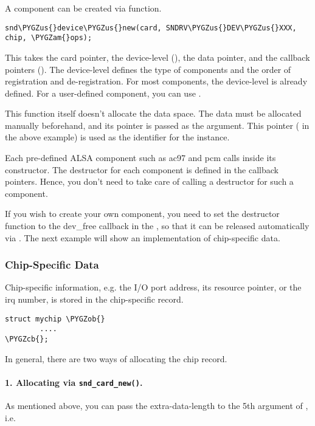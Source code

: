 \documentclass[a4paper,8pt,english]{sphinxmanual}
\def\PYGZus{\char`\_}
\def\PYGZob{\char`\{}
\def\PYGZcb{\char`\}}
\def\PYGZam{\char`\&}
\begin{document}
A component can be created via 
function.

\begin{Verbatim}[commandchars=\\\{\}]
snd\PYGZus{}device\PYGZus{}new(card, SNDRV\PYGZus{}DEV\PYGZus{}XXX, chip, \PYGZam{}ops);
\end{Verbatim}

This takes the card pointer, the device-level (), the
data pointer, and the callback pointers (). The device-level
defines the type of components and the order of registration and
de-registration. For most components, the device-level is already
defined. For a user-defined component, you can use
.

This function itself doesn't allocate the data space. The data must be
allocated manually beforehand, and its pointer is passed as the
argument. This pointer ( in the above example) is used as the
identifier for the instance.

Each pre-defined ALSA component such as ac97 and pcm calls
 inside its constructor. The destructor
for each component is defined in the callback pointers. Hence, you don't
need to take care of calling a destructor for such a component.

If you wish to create your own component, you need to set the destructor
function to the dev\_free callback in the , so that it can be
released automatically via . The next
example will show an implementation of chip-specific data.


\subsubsection{Chip-Specific Data}
\label{sound/kernel-api/writing-an-alsa-driver:chip-specific-data}
Chip-specific information, e.g. the I/O port address, its resource
pointer, or the irq number, is stored in the chip-specific record.

\begin{Verbatim}[commandchars=\\\{\}]
struct mychip \PYGZob{}
        ....
\PYGZcb{};
\end{Verbatim}

In general, there are two ways of allocating the chip record.


\paragraph{1. Allocating via \texttt{snd\_card\_new()}.}
\label{sound/kernel-api/writing-an-alsa-driver:allocating-via-snd-card-new}
As mentioned above, you can pass the extra-data-length to the 5th
argument of , i.e.
\end{document}
